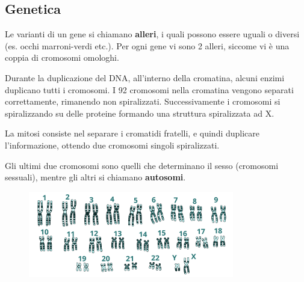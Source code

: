 \documentclass[a4paper]{article}
\begin{document}
\subsection{Genetica}


Le varianti di un gene si chiamano \textbf{alleri}, i quali possono essere uguali o diversi
(es. occhi marroni-verdi etc.). Per ogni gene vi sono 2 alleri, siccome vi è una coppia di cromosomi omologhi.


Durante la duplicazione del DNA, all'interno della cromatina,
alcuni enzimi duplicano tutti i cromosomi.
I 92 cromosomi nella cromatina vengono separati correttamente, rimanendo non spiralizzati.
Successivamente i cromosomi si spiralizzando su delle proteine formando una struttura spiralizzata ad X.


La mitosi consiste nel separare i cromatidi fratelli, e quindi duplicare l'informazione,
ottendo due cromosomi singoli spiralizzati.


Gli ultimi due cromosomi sono quelli che determinano il sesso (cromosomi sessuali),
mentre gli altri si chiamano \textbf{autosomi}.

\begin{center}
\begin{figure}[ht]
    \centering
    \includegraphics[width=0.8\textwidth]{./cariotipo}
\end{figure}
\end{center}
\end{document}
